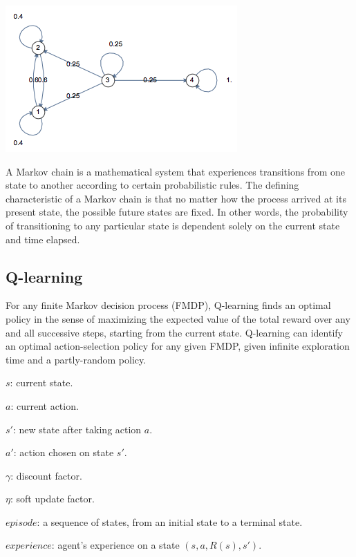 \documentclass{article}
\begin{document}
\begin{center}
\includegraphics[scale=0.6]{./images/markov_chain_graph.png}
\end{center}

\noindent A Markov chain is a mathematical system that experiences transitions from one state to another according to certain probabilistic rules. The defining characteristic of a Markov chain is that no matter how the process arrived at its present state, the possible future states are fixed. In other words, the probability of transitioning to any particular state is dependent solely on the current state and time elapsed.

\subsection{Q-learning}

\noindent For any finite Markov decision process (FMDP), Q-learning finds an optimal policy in the sense of maximizing the expected value of the total reward over any and all successive steps, starting from the current state. Q-learning can identify an optimal action-selection policy for any given FMDP, given infinite exploration time and a partly-random policy.

\bigskip

\noindent \(s\): current state.

\noindent \(a\): current action.

\noindent \(s'\): new state after taking action \(a\).

\noindent \(a'\): action chosen on state \(s'\).

\noindent \(\gamma\): discount factor.

\noindent \(\eta\): soft update factor.

\noindent \(episode\): a sequence of states, from an initial state to a terminal state.

\noindent \(experience\): agent's experience on a state \((s, a, R(s), s')\).
\end{document}
